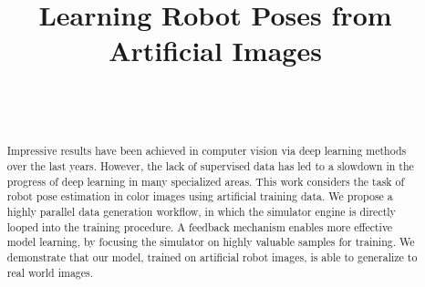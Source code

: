 \documentclass[conference]{IEEEtran}
\begin{document}
\title{Learning Robot Poses from Artificial Images\\
}

\newif\iffinalcopy

\finalcopytrue

\iffinalcopy

    \author{
        \\
        \\
    }

\else

    \author{
        \IEEEauthorblockN{
            Author
        }
        \\
        \IEEEauthorblockA{
            \IEEEauthorrefmark{1}\textit{Affiliation}
        }
    }

\fi


\maketitle

\begin{abstract}
    Impressive results have been achieved in computer vision via deep learning methods over the last years. However, the lack of supervised data has led to a slowdown in the progress of deep learning in many specialized areas. This work considers the task of robot pose estimation in color images using artificial training data. We propose a highly parallel data generation workflow, in which the simulator engine is directly looped into the training procedure. A feedback mechanism enables more effective model learning, by focusing the simulator on highly valuable samples for training. We demonstrate that our model, trained on artificial robot images, is able to generalize to real world images. 
\end{abstract}
\end{document}
